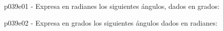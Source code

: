 \documentclass[spanish, 11pt]{exam}
\begin{document}
        \begin{questions}
        \question p039e01 - Expresa en radianes los siguientes ángulos, dados en grados:
        \begin{multicols}{3} 
        \end{multicols}
        \question p039e02 - Expresa en grados los siguientes ángulos dados en radianes:
        \begin{multicols}{3} 

\end{multicols}
\end{questions}
\end{document}
